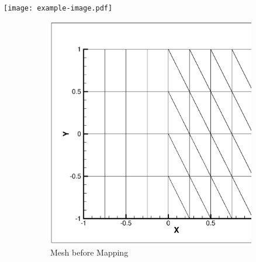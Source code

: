 \documentclass[12pt,Bold,letterpaper,TexShade]{mcgilletdclass}
\numberwithin{equation}{section}
\begin{document}
\begin{minipage}{\textwidth}
\centering
    \texttt{[image: example-image.pdf]}
 \label{fig:fig1}
\end{minipage}


\begin{figure}
    \centering
    \begin{subfigure}[b]{0.45\textwidth}
        \includegraphics[width=\textwidth]{./figures/StructuredMixedML1P4_ToBeCurved.eps}
        \caption{Mesh before Mapping}
    \end{subfigure}
    ~
    \begin{subfigure}[b]{0.45\textwidth}

\end{subfigure}
\end{figure}
\end{document}
